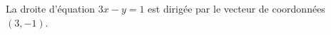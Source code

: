 La droite d'équation $3x-y=1$ est dirigée par le vecteur de coordonnées $(3,-1)$.

\begin{reponses}
\end{reponses}

